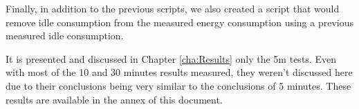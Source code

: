 Finally, in addition to the previous scripts, we also created a script that would remove idle consumption from the measured energy consumption using a previous measured idle consumption.






It is presented and discussed in Chapter \ref{cha:Results} only the 5m tests. Even with most of the 10 and 30 minutes results measured, they weren't discussed here due to their conclusions being very similar to the conclusions of 5 minutes. These results are available in the annex of this document.



